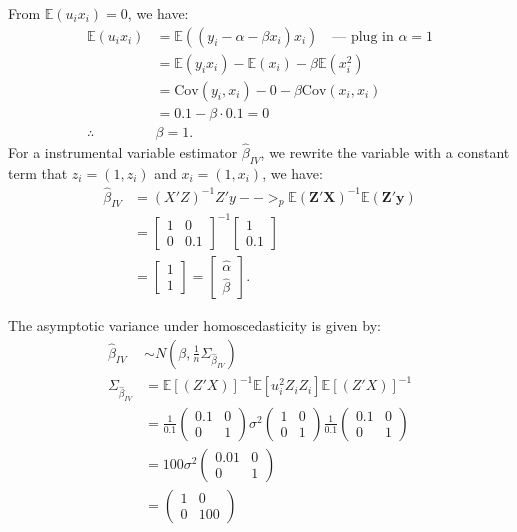 \documentclass{article}
\begin{document}
From  \( \mathbb{E}(u_i x_i) = 0 \),  we have:
\begin{align*}
\mathbb{E}(u_i x_i) &= \mathbb{E}((y_i - \alpha - \beta x_i) x_i) \quad \text{--- plug in } \alpha = 1 \\
                    &= \mathbb{E}(y_i x_i) - \mathbb{E}(x_i) - \beta \mathbb{E}(x_i^2) \\
                    &= \text{Cov}(y_i, x_i) - 0 - \beta \text{Cov}(x_i, x_i) \\
                    &= 0.1 - \beta \cdot 0.1 = 0 \\
\therefore \quad &\beta = 1.
\end{align*}
For a instrumental variable estimator \( \hat{\beta}_{IV} \), we rewrite the variable with a constant term that \( z_i = (1, z_i) \) and \( x_i = (1, x_i) \), we have:
\begin{align*}
\hat{\beta}_{IV} &= (X'Z)^{-1} Z'y -->_p \mathbb{E}(\mathbf{Z}' \mathbf{X})^{-1} \mathbb{E}(\mathbf{Z}' \mathbf{y}) \\
                 &=  \begin{bmatrix} 1 & 0 \\ 0 & 0.1 \end{bmatrix}^{-1} \begin{bmatrix} 1 \\ 0.1 \end{bmatrix} \\
                 &= \begin{bmatrix}
                     1 \\ 1
                 \end{bmatrix} = \begin{bmatrix} \hat{\alpha} \\ \hat{\beta} \end{bmatrix}. 
\end{align*}

The asymptotic variance under homoscedasticity is given by:
\begin{align*}
\hat{\beta}_{IV} &\sim N(\beta, \frac{1}{n}\Sigma_{\hat{\beta}_{IV}})\\
\Sigma_{\hat{\beta}_{IV}} &= \mathbb{E}[(Z'X)]^{-1} \mathbb{E}[u_i^2 Z_i Z_i] \mathbb{E}[(Z'X)]^{-1}  \\
&= \frac{1}{0.1} \begin{pmatrix}
0.1 & 0\\
0 & 1
\end{pmatrix} 
\sigma^2 \begin{pmatrix}
1 & 0\\
0 & 1
\end{pmatrix} \frac{1}{0.1} \begin{pmatrix}
0.1 & 0\\
0 & 1
\end{pmatrix} \\
&= 100 \sigma^2 \begin{pmatrix}
0.01 & 0\\
0 & 1
\end{pmatrix}\\
&= \begin{pmatrix}
1 & 0\\
0 & 100
\end{pmatrix}
\end{align*}
\end{document}
